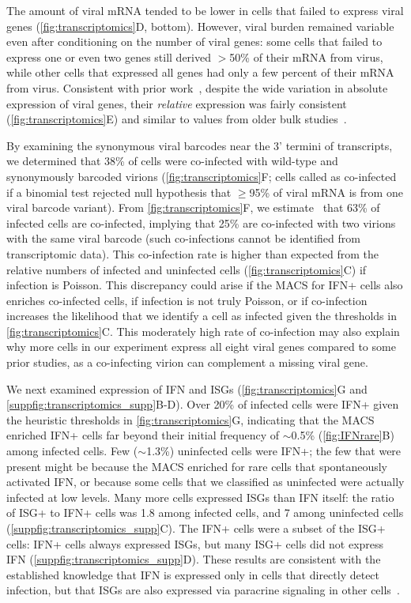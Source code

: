 \documentclass[10pt,letterpaper]{article}
\newcommand{\FIG}[1]{\autoref{fig:#1}}
\newcommand{\SUPPFIG}[1]{\autoref{suppfig:#1}}
\begin{document}
The amount of viral mRNA tended to be lower in cells that failed to express viral genes (\FIG{transcriptomics}D, bottom).
However, viral burden remained variable even after conditioning on the number of viral genes: some cells that failed to express one or even two genes still derived $>$50\% of their mRNA from virus, while other cells that expressed all genes had only a few percent of their mRNA from virus.
Consistent with prior work~\citep{russell2018extreme}, despite the wide variation in absolute expression of viral genes, their \emph{relative} expression was fairly consistent (\FIG{transcriptomics}E) and similar to values from older bulk studies~\citep{hatada1989control}.

By examining the synonymous viral barcodes near the 3' termini of transcripts, we determined that 38\% of cells were co-infected with wild-type and synonymously barcoded virions (\FIG{transcriptomics}F; cells called as co-infected if a binomial test rejected null hypothesis that $\ge$95\% of viral mRNA is from one viral barcode variant).
From \FIG{transcriptomics}F, we estimate~\citep{bloom2018estimating} that 63\% of infected cells are co-infected, implying that 25\% are co-infected with two virions with the same viral barcode (such co-infections cannot be identified from transcriptomic data).
This co-infection rate is higher than expected from the relative numbers of infected and uninfected cells (\FIG{transcriptomics}C) if infection is Poisson.
This discrepancy could arise if the MACS for IFN+ cells also enriches co-infected cells, if infection is not truly Poisson, or if co-infection increases the likelihood that we identify a cell as infected given the thresholds in \FIG{transcriptomics}C.
This moderately high rate of co-infection may also explain why more cells in our experiment express all eight viral genes compared to some prior studies, as a co-infecting virion can complement a missing viral gene. 

We next examined expression of IFN and ISGs (\FIG{transcriptomics}G and \SUPPFIG{transcriptomics_supp}B-D).
Over 20\% of infected cells were IFN+ given the heuristic thresholds in \FIG{transcriptomics}G, indicating that the MACS enriched IFN+ cells far beyond their initial frequency of $\sim$0.5\% (\FIG{IFNrare}B) among infected cells.
Few ($\sim$1.3\%) uninfected cells were IFN+; the few that were present might be because the MACS enriched for rare cells that spontaneously activated IFN, or because some cells that we classified as uninfected were actually infected at low levels.
Many more cells expressed ISGs than IFN itself: the ratio of ISG+ to IFN+ cells was 1.8 among infected cells, and 7 among uninfected cells (\SUPPFIG{transcriptomics_supp}C).
The IFN+ cells were a subset of the ISG+ cells: IFN+ cells always expressed ISGs, but many ISG+ cells did not express IFN (\SUPPFIG{transcriptomics_supp}D).
These results are consistent with the established knowledge that IFN is expressed only in cells that directly detect infection, but that ISGs are also expressed via paracrine signaling in other cells~\citep{stetson2006type,honda2006type}.
\end{document}
